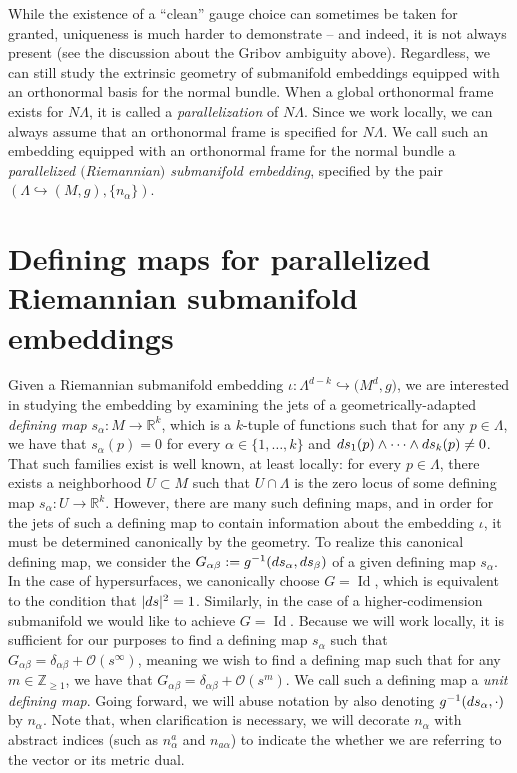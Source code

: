 \documentclass[11pt]{article}
\numberwithin{equation}{section}
\renewcommand{\=}{\stackrel \Lambda =}
\DeclareMathOperator{\Id}{Id}
\begin{document}
While the existence of a ``clean'' gauge choice can sometimes be taken for granted, uniqueness is much harder to demonstrate -- and indeed, it is not always present (see the discussion about the Gribov ambiguity above). Regardless, we can still study the extrinsic geometry of submanifold embeddings equipped with an orthonormal basis for the normal bundle. When a global orthonormal frame exists for $N \Lambda$, it is called a \textit{parallelization} of $N \Lambda$. Since we work locally, we can always assume that an orthonormal frame is specified for $N \Lambda$. We call such an embedding equipped with an orthonormal frame for the normal bundle a \textit{parallelized $($Riemannian$)$ submanifold embedding}, specified by the pair $(\Lambda \hookrightarrow (M,g), \{n_{\alpha}\})$.

\section[Defining maps for parallelized Riemannian submanifold embeddings]{Defining maps for parallelized Riemannian submanifold\\ embeddings} \label{unit-def-funcs}

Given a Riemannian submanifold embedding $\iota \colon \Lambda^{d-k} \hookrightarrow \bigl(M^d,g\bigr)$, we are interested in studying the embedding by examining the jets of a geometrically-adapted \textit{defining map} $s_{\alpha} \colon M \rightarrow \mathbb{R}^k$, which is a $k$-tuple of functions such that for any $p \in \Lambda$, we have that $s_{\alpha}(p) = 0$ for every $\alpha \in \{1, \ldots, k\}$ and ${\rm d}s_{1}(p) \wedge \cdots \wedge {\rm d}s_{k}(p) \neq 0$. That such families exist is well known, at least locally: for every $p \in \Lambda$, there exists a neighborhood $U \subset M$ such that $U \cap \Lambda$ is the zero locus of some defining map $s_{\alpha} \colon U \rightarrow \mathbb{R}^k$. However, there are many such defining maps, and in order for the jets of such a defining map to contain information about the embedding $\iota$, it must be determined canonically by the geometry. To realize this canonical defining map, we consider the  $G_{\alpha \beta} := g^{-1}({\rm d}s_{\alpha},{\rm d}s_{\beta})$ of a given defining map $s_{\alpha}$. In the case of hypersurfaces, we canonically choose $G = \Id$, which is equivalent to the condition that $|{\rm d}s|^2 = 1$. Similarly, in the case of a higher-codimension submanifold we would like to achieve $G= \Id$. Because we will work locally, it is sufficient for our purposes to find a defining map $s_{\alpha}$ such that $G_{\alpha \beta} = \delta_{\alpha \beta} + \mathcal{O}(s^\infty)$, meaning we wish to find a defining map such that for any $m \in \mathbb{Z}_{\geq 1}$, we have that $G_{\alpha \beta} = \delta_{\alpha \beta} + \mathcal{O}(s^m)$. We call such a defining map a \textit{unit defining map}. Going forward, we will abuse notation by also denoting $g^{-1}({\rm d}s_{\alpha},\cdot)$ by $n_{\alpha}$. Note that, when clarification is necessary, we will decorate $n_{\alpha}$ with abstract indices (such as $n^a_{\alpha}$ and $n_{a \alpha}$) to indicate the whether we are referring to the vector or its metric dual.
\end{document}
